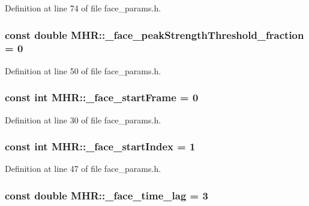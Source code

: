 Definition at line 74 of file face\+\_\+params.\+h.

\hypertarget{namespace_m_h_r_adad3be408f5b45234ee745acc33d6ac8}{
\subsubsection[{\+\_\+face\+\_\+peak\+Strength\+Threshold\+\_\+fraction}]{\setlength{\rightskip}{0pt plus 5cm}const double M\+H\+R\+::\+\_\+face\+\_\+peak\+Strength\+Threshold\+\_\+fraction = 0}}\label{namespace_m_h_r_adad3be408f5b45234ee745acc33d6ac8}


Definition at line 50 of file face\+\_\+params.\+h.

\hypertarget{namespace_m_h_r_ac893410fca7e7a76ae562e47f8371cc1}{
\subsubsection[{\+\_\+face\+\_\+start\+Frame}]{\setlength{\rightskip}{0pt plus 5cm}const int M\+H\+R\+::\+\_\+face\+\_\+start\+Frame = 0}}\label{namespace_m_h_r_ac893410fca7e7a76ae562e47f8371cc1}


Definition at line 30 of file face\+\_\+params.\+h.

\hypertarget{namespace_m_h_r_a5c705653d488611b87b11e41e4ffbfd5}{
\subsubsection[{\+\_\+face\+\_\+start\+Index}]{\setlength{\rightskip}{0pt plus 5cm}const int M\+H\+R\+::\+\_\+face\+\_\+start\+Index = 1}}\label{namespace_m_h_r_a5c705653d488611b87b11e41e4ffbfd5}


Definition at line 47 of file face\+\_\+params.\+h.

\hypertarget{namespace_m_h_r_ad108537351ba024dfa150411983a69c4}{
\subsubsection[{\+\_\+face\+\_\+time\+\_\+lag}]{\setlength{\rightskip}{0pt plus 5cm}const double M\+H\+R\+::\+\_\+face\+\_\+time\+\_\+lag = 3}}\label{namespace_m_h_r_ad108537351ba024dfa150411983a69c4}


